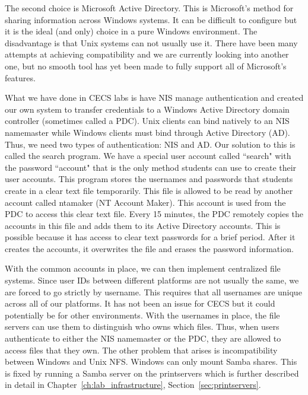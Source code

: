 The second choice is Microsoft Active Directory.  This is Microsoft's method for sharing information across Windows systems.  It can be difficult to configure but it is the ideal (and only) choice in a pure Windows environment.  The disadvantage is that Unix systems can not usually use it.  There have been many attempts at achieving compatibility and we are currently looking into another one, but no smooth tool has yet been made to fully support all of Microsoft's features.  

What we have done in CECS labs is have NIS manage authentication and created our own system to transfer credentials to a Windows Active Directory domain controller (sometimes called a PDC).  Unix clients can bind natively to an NIS namemaster while Windows clients must bind through Active Directory (AD).  Thus, we need two types of authentication: NIS and AD.  Our solution to this is called the search program.  We have a special user account called ``search" with the password ``account" that is the only method students can use to create their user accounts.  This program stores the usernames and passwords that students create in a clear text file temporarily.  This file is allowed to be read by another account called ntamaker (NT Account Maker).  This account is used from the PDC to access this clear text file.  Every 15 minutes, the PDC remotely copies the accounts in this file and adds them to its Active Directory accounts.  This is possible because it has access to clear text passwords for a brief period.  After it creates the accounts, it overwrites the file and erases the password information.

With the common accounts in place, we can then implement centralized file systems.  Since user IDs between different platforms are not usually the same, we are forced to go strictly by username.  This requires that all usernames are unique across all of our platforms.  It has not been an issue for CECS but it could potentially be for other environments.  With the usernames in place, the file servers can use them to distinguish who owns which files.  Thus, when users authenticate to either the NIS namemaster or the PDC, they are allowed to access files that they own.  The other problem that arises is incompatibility between Windows and Unix NFS.  Windows can only mount Samba shares.  This is fixed by running a Samba server on the printservers which is further described in detail in Chapter~\ref{ch:lab_infrastructure}, Section~\ref{sec:printservers}.  

